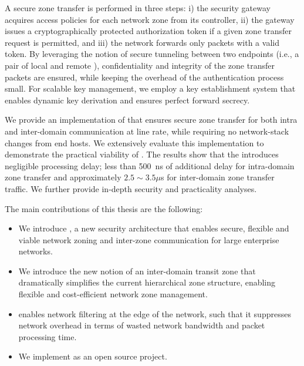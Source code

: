 A secure zone transfer is performed in three steps: i) the security gateway
acquires access policies for each network zone from its controller, ii) the
gateway issues a cryptographically protected authorization token if a given zone
transfer request is permitted, and iii) the network forwards only packets with a
valid token. By leveraging the notion of secure tunneling between two endpoints
(i.e., a pair of local and remote \tps), confidentiality and integrity of the
zone transfer packets are ensured, while keeping the overhead of the
authentication process small. For scalable key management, we employ a key
establishment system that enables dynamic key derivation and ensures perfect
forward secrecy.

We provide an implementation of \name that ensures secure zone transfer for
both intra and inter-domain communication at line rate, while requiring no network-stack
changes from end hosts. We extensively evaluate this implementation to demonstrate
the practical viability of \name. The results show that the \tp introduces negligible
processing delay; less than \SI{500}{ns} of additional delay for intra-domain zone transfer
and approximately $2.5 \sim 3.5 \mu$s for inter-domain zone transfer traffic. We further
provide in-depth security and practicality analyses.



The main contributions of this thesis are the following:
\begin{itemize}
	\item We introduce \name, a new security architecture that enables secure, flexible
	      and viable network zoning and inter-zone communication for large enterprise
	      networks.
	\item We introduce the new notion of an inter-domain transit zone that dramatically
	      simplifies the current hierarchical zone structure, enabling flexible and cost-efficient
	      network zone management.
	\item \name enables network filtering at the edge of the network, such that it suppresses
	      network overhead in terms of wasted network bandwidth and packet processing time.
	\item We implement \name as an open source project.
\end{itemize}

